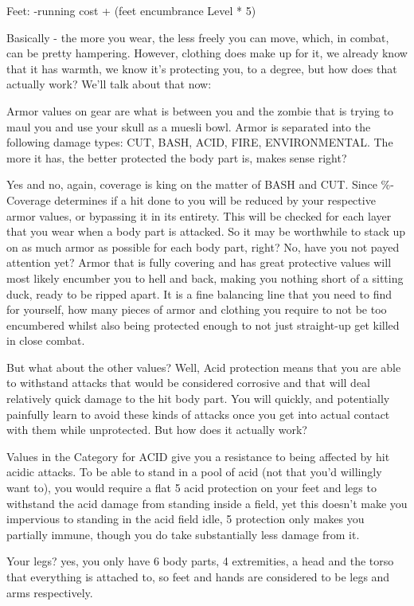Feet:
-running cost + (feet encumbrance Level * 5)

Basically - the more you wear, the less freely you can move, which, in combat, can be pretty hampering. However, clothing does make up for it, we already know that it has warmth, we know it's protecting you, to a degree, but how does that actually work? We'll talk about that now:

Armor values on gear are what is between you and the zombie that is trying to maul you and use your skull as a muesli bowl. Armor is separated into the following damage types: CUT, BASH, ACID, FIRE, ENVIRONMENTAL. The more it has, the better protected the body part is, makes sense right?

Yes and no, again, coverage is king on the matter of BASH and CUT. Since \%-Coverage determines if a hit done to you will be reduced by your respective armor values, or bypassing it in its entirety. This will be checked for each layer that you wear when a body part is attacked. So it may be worthwhile to stack up on as much armor as possible for each body part, right? No, have you not payed attention yet? Armor that is fully covering and has great protective values will most likely encumber you to hell and back, making you nothing short of a sitting duck, ready to be ripped apart. It is a fine balancing line that you need to find for yourself, how many pieces of armor and clothing you require to not be too encumbered whilst also being protected enough to not just straight-up get killed in close combat.

But what about the other values? Well, Acid protection means that you are able to withstand attacks that would be considered corrosive and that will deal relatively quick damage to the hit body part. You will quickly, and potentially painfully learn to avoid these kinds of attacks once you get into actual contact with them while unprotected. But how does it actually work?

Values in the Category for ACID give you a resistance to being affected by hit acidic attacks. To be able to stand in a pool of acid (not that you'd willingly want to), you would require a flat 5 acid protection on your feet and legs to withstand the acid damage from standing inside a field, yet this doesn't make you impervious to standing in the acid field idle, 5 protection only makes you partially immune, though you do take substantially less damage from it.

Your legs? yes, you only have 6 body parts, 4 extremities, a head and the torso that everything is attached to, so feet and hands are considered to be legs and arms respectively.

